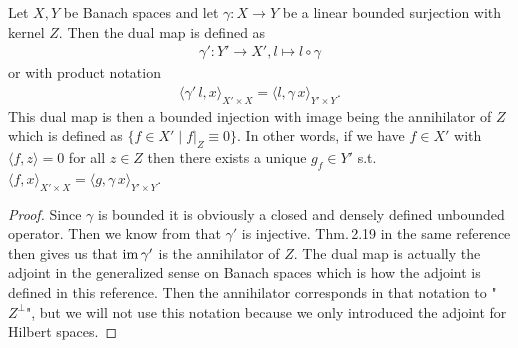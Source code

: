 \documentclass[../main.tex]{subfiles}
\begin{document}
\begin{lemma}\label{lem:dual_map_of_surjective_operator}
    Let $X, Y$ be Banach spaces and let $\gamma: X \rightarrow Y$ be a 
    linear bounded surjection with kernel $Z$. Then the dual map is defined as
    \begin{align*}
        \gamma': Y' \rightarrow X', l \mapsto l \circ \gamma
    \end{align*}
    or with product notation
    \begin{align*}
        \langle \gamma' \, l, x \rangle_{X' \times X} = \langle l, \gamma\,x \rangle_{Y'\times Y}.
    \end{align*}
    This dual map is then a bounded injection with image 
    being the annihilator of $Z$ which is defined as 
    $\{ f \in X' \mid f|_Z \equiv 0 \}$. In other words, if we have $f \in X'$
    with $\langle f, z \rangle = 0$ for all $z \in Z$ then there exists a unique 
    $g_f \in Y'$ s.t. $\langle f, x \rangle_{X' \times X} = \langle g, \gamma \, x \rangle_{Y'\times Y}$.
\end{lemma}
\begin{proof}
    Since $\gamma$ is bounded it is obviously a closed and densely defined 
    unbounded operator. Then we know from \cite[Thm.\,2.20]{brezis} that 
    $\gamma'$ is injective. Thm.\,2.19 in the same reference 
    then gives us that $\operatorname{im} \gamma'$ is the annihilator of $Z$. 
    The dual map is actually the adjoint in the generalized sense on Banach spaces 
    which is how the adjoint is defined in this reference. Then the 
    annihilator corresponds in that notation to "$Z^\perp$", but we will not use 
    this notation because we only introduced the adjoint for Hilbert spaces.
\end{proof}
\end{document}
